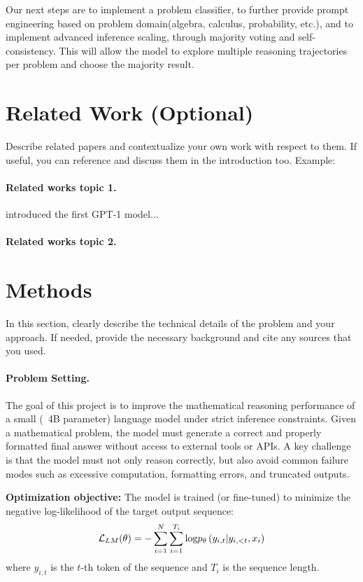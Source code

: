 \documentclass{article}
\begin{document}
Our next steps are to implement a problem classifier, to further provide prompt engineering based on problem domain(algebra, calculus, probability, etc.), and to implement advanced inference scaling, through majority voting and self-consistency. This will allow the model to explore multiple reasoning trajectories per problem and choose the majority result.

\section{Related Work (Optional)}
\label{sec:relatedwork}
Describe related papers and contextualize your own work with respect to them. If useful, you can reference and discuss them in the introduction too. Example:
\paragraph{Related works topic 1.} \citet{radford2018improving} introduced the first GPT-1 model...  %

\paragraph{Related works topic 2.}
% 

\section{Methods}
\label{sec:methods}
In this section, clearly describe the technical details of the problem and your approach. If needed, provide the necessary background and cite any sources that you used.


\paragraph{Problem Setting.}

The goal of this project is to improve the mathematical reasoning performance of a small (~4B parameter) language model under strict inference constraints. Given a mathematical problem, the model must generate a correct and properly formatted final answer without access to external tools or APIs. A key challenge is that the model must not only reason correctly, but also avoid common failure modes such as excessive computation, formatting errors, and truncated outputs.

\textbf{Optimization objective:}
The model is trained (or fine-tuned) to minimize the negative log-likelihood of the target output sequence:
$$\mathcal{L}_{LM}(\theta)=- \sum^N_{i=1} \sum^{T_i}_{i=1} \text{log} \space p_\theta\left( y_{i,t} | y_{i, <t}, x_i\right)$$
where $y_{i, t}$ is the $t$-th token of the sequence and $T_i$ is the sequence length.
\end{document}

